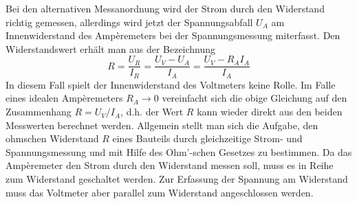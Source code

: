 \noindent Bei den alternativen Messanordnung wird der Strom durch den Widerstand richtig gemessen, allerdings wird jetzt der Spannungsabfall $U_A$ am Innenwiderstand des Ampèremeters bei der Spannungsmessung miterfasst. Den Widerstandswert erhält man aus der Bezeichnung
\begin{equation}
\boxed{R=\dfrac{U_R}{I_R}=\dfrac{U_V-U_A}{I_A}=\dfrac{U_V-R_AI_A}{I_A}}
\end{equation}
In diesem Fall spielt der Innenwiderstand des Voltmeters keine Rolle. Im Falle eines idealen Ampèremeters $R_A\rightarrow 0$ vereinfacht sich die obige Gleichung auf den Zusammenhang $R=U_V/I_A$, d.h. der Wert $R$ kann wieder direkt aus den beiden Messwerten berechnet werden.
\newline\newline
Allgemein stellt man sich die Aufgabe, den ohmschen Widerstand $R$ eines Bauteils durch gleichzeitige Strom- und Spannungsmessung und mit Hilfe des Ohm'-schen Gesetzes zu bestimmen. Da das Ampèremeter den Strom durch den Widerstand messen soll, muss es in Reihe zum Widerstand geschaltet werden. Zur Erfassung der Spannung am Widerstand muss das Voltmeter aber parallel zum Widerstand angeschlossen werden.



